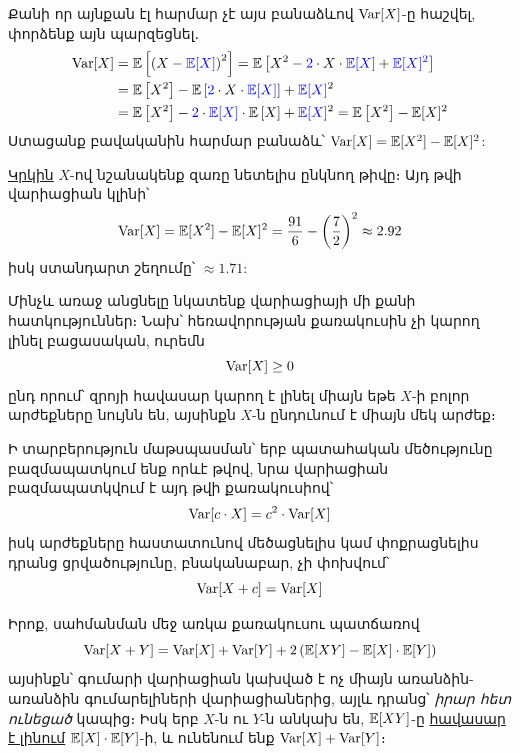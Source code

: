 
Քանի որ այնքան էլ հարմար չէ այս բանաձևով $\operatorname{Var}[X]$-ը հաշվել, փորձենք այն պարզեցնել․
\begin{align*}
\Var[X] 
&= \E\left[\left(X - {\color{myblue}\E[X]}\right)^2\right] 
= \E\left[X^2 - {\color{myblue} 2} \cdot X \cdot {\color{myblue}\E[X]} + {\color{myblue}\E[X]^2} \right] 
\\
&= \E\left[X^2\right] - \E\left[{\color{myblue} 2} \cdot X \cdot {\color{myblue}\E[X]}\right] + {\color{myblue}\E[X]}^2
\\
&= \E\left[X^2\right] - {\color{myblue} 2} \cdot {\color{myblue}\E[X]} \cdot \E\left[X \right] + {\color{myblue}\E[X]}^2 = \E\left[X^2\right] - \E[X]^2
\end{align*}
Ստացանք բավականին հարմար բանաձև՝ $\operatorname{Var}[X] = \mathbb{E}[X^2] - \mathbb{E}[X]^2$:

\begin{example}
\hyperref[die_rv]{\color{OliveGreen} Կրկին} $X$-ով նշանակենք զառը նետելիս ընկնող թիվը։ Այդ թվի վարիացիան կլինի՝
\[
\operatorname{Var}[X] = \mathbb{E}[X^2] - \mathbb{E}[X]^2 = \frac{91}{6} - \left(\frac{7}{2}\right)^2 \approx 2.92
\]
իսկ ստանդարտ շեղումը՝ $\approx 1.71$:
\end{example}

Մինչև առաջ անցնելը նկատենք վարիացիայի մի քանի հատկություններ։ Նախ՝ հեռավորության քառակուսին չի կարող լինել բացասական, ուրեմն
\[
\operatorname{Var}[X] \ge 0
\]
ընդ որում՝ զրոյի հավասար կարող է լինել միայն եթե $X$-ի բոլոր արժեքները նույնն են, այսինքն $X$-ն ընդունում է միայն մեկ արժեք։ 

Ի տարբերություն մաթսպասման՝ երբ պատահական մեծությունը բազմապատկում ենք որևէ թվով, նրա վարիացիան բազմապատկվում է այդ թվի քառակուսիով՝
\[
\operatorname{Var}[c\cdot X] = c^2 \cdot \operatorname{Var}[X]
\]
իսկ արժեքները հաստատունով մեծացնելիս կամ փոքրացնելիս դրանց ցրվածությունը, բնականաբար, չի փոխվում՝
\[
\operatorname{Var}[X + c] = \operatorname{Var}[X]
\]


Իրոք, սահմանման մեջ առկա քառակուսու պատճառով
\[ 
\operatorname{Var}[X + Y] = \operatorname{Var}[X] + \operatorname{Var}[Y] + 2\left(\mathbb{E}[XY] - \mathbb{E}[X] \cdot \mathbb{E}[Y]\right)
\]
այսինքն՝  գումարի վարիացիան կախված է ոչ միայն առանձին-առանձին գումարելիների վարիացիաներից, այլև դրանց՝ \textit{իրար հետ ունեցած} կապից։
Իսկ երբ $X$-ն ու $Y$-ն անկախ են, $\mathbb{E}[XY]$-ը \hyperref[independence_E]{\color{OliveGreen} հավասար է լինում} $\mathbb{E}[X] \cdot \mathbb{E}[Y]$-ի, և ունենում ենք $\operatorname{Var}[X] + \operatorname{Var}[Y]$։

